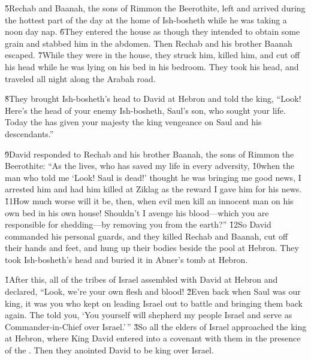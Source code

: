 \v{5}Rechab and Baanah, the sons of Rimmon the Beerothite, left and arrived during the hottest part of the day at the home of Ish-bosheth while he was taking a noon day nap. \v{6}They entered the house as though they intended to obtain some grain and stabbed him in the abdomen. Then Rechab and his brother Baanah escaped. \v{7}While they were in the house, they struck him, killed him, and cut off his head while he was lying on his bed in his bedroom. They took his head, and traveled all night along the Arabah road.

\v{8}They brought Ish-bosheth's head to David at Hebron and told the king, ``Look! Here's the head of your enemy Ish-bosheth, Saul's son, who sought your life. Today the  has given your majesty the king vengeance on Saul and his descendants.''

\v{9}David responded to Rechab and his brother Baanah, the sons of Rimmon the Beerothite: ``As the  lives, who has saved my life in every adversity, \v{10}when the man who told me `Look! Saul is dead!' thought he was bringing me good news, I arrested him and had him killed at Ziklag as the reward I gave him for his news. \v{11}How much worse will it be, then, when evil men kill an innocent man on his own bed in his own house! Shouldn't I avenge his blood---which you are responsible for shedding---by removing you from the earth?'' \v{12}So David commanded his personal guards, and they killed Rechab and Baanah, cut off their hands and feet, and hung up their bodies beside the pool at Hebron. They took Ish-bosheth's head and buried it in Abner's tomb at Hebron.

\v{1}After this, all of the tribes of Israel assembled with David at Hebron and declared, ``Look, we're your own flesh and blood! \v{2}Even back when Saul was our king, it was you who kept on leading Israel out to battle and bringing them back again. The  told you, `You yourself will shepherd my people Israel and serve as Commander-in-Chief over Israel.'\,'' \v{3}So all the elders of Israel approached the king at Hebron, where King David entered into a covenant with them in the presence of the . Then they anointed David to be king over Israel.

